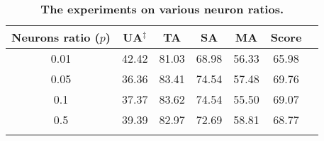 \renewcommand{\arraystretch}{1.1}
\begin{table}[h]
\centering
\resizebox{1.0\linewidth}{!}
{
\begin{tabular}{ccccccc}\toprule
\bf Neurons ratio ($p$)  & \bf UA$^{\ddag}$ & \bf TA  & \bf SA & \bf MA & \bf Score \\ \toprule
0.01 & 42.42 & 81.03 & 68.98 & 56.33 & 65.98 \\
0.05 & 36.36 &  83.41 & 74.54 & 57.48 & 69.76 \\
0.1 & 37.37 & 83.62 & 74.54 & 55.50 & 69.07 \\
0.5 & 39.39 & 82.97 & 72.69 & 58.81 & 68.77 \\\bottomrule
\vspace{-0.8cm}
\end{tabular}
}
\caption{\textbf{The experiments on various neuron ratios.}}
\label{tab:larger}
\end{table}




